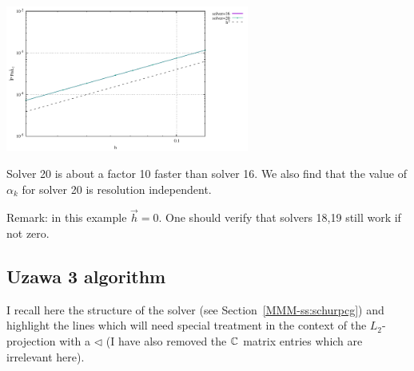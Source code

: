 \begin{center}
\includegraphics[width=8cm]{python_codes/fieldstone_147/RESULTS/L2/uzawa2/errorsP.pdf}
\end{center}

Solver 20 is about a factor 10 faster than solver 16.
We also find that the value of $\alpha_k$ for solver 20 is resolution independent.

Remark: in this example $\vec{h}=0$. One should verify that solvers 18,19 still work if not zero.

\subsection*{Uzawa 3 algorithm}

I recall here the structure of the solver (see Section~\ref{MMM-ss:schurpcg})
and highlight the lines which will need special treatment in the context of the $L_2$-projection
with a $\triangleleft$ (I have also removed the ${\mathbb{C}}$ matrix entries which are irrelevant here).

